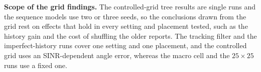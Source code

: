 \noindent\textbf{Scope of the grid findings.} The controlled-grid tree results are single runs and the sequence models use two or three seeds, so the conclusions drawn from the grid rest on effects that hold in every setting and placement tested, such as the history gain and the cost of shuffling the older reports. The tracking filter and the imperfect-history runs cover one setting and one placement, and the controlled grid uses an SINR-dependent angle error, whereas the macro cell and the $25\times25$ runs use a fixed one.
